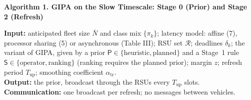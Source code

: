 \documentclass[10pt]{article}
\begin{document}
\begin{center}
{\large\bfseries Algorithm 1. GIPA on the Slow Timescale: Stage 0 (Prior) and Stage 2 (Refresh)}
\end{center}
\vspace{-3pt}

{\small
\textbf{Input:}
anticipated fleet size $\bar N$ and class mix $\{\pi_k\}$;
latency model: affine (7), processor sharing (5) or asynchronous (Table III);
RSU set $\mathcal R$; deadlines $\delta_k$;
the variant of GIPA, given by a prior $\mathsf P\in\{\text{heuristic},\text{planned}\}$ and a Stage~1 rule
$\mathsf S\in\{\text{operator},\text{ranking}\}$ (ranking requires the planned prior);
margin $z$; refresh period $T_{\mathrm{up}}$; smoothing coefficient $\alpha_{\mathrm{tr}}$.\\
\textbf{Output:} the prior, broadcast through the RSUs every $T_{\mathrm{up}}$ slots.\\
\textbf{Communication:} one broadcast per refresh; no messages between vehicles.
}
\end{document}
